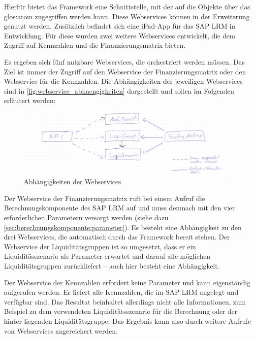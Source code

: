 \begin{onehalfspacing}
Hierfür bietet das Framework eine Schnittstelle, mit der auf die Objekte über das \gls{glos:atom} zugegriffen werden kann. Diese Webservices können in der Erweiterung genutzt werden. Zusätzlich befindet sich eine iPad-App für das SAP LRM in Entwicklung. Für diese wurden zwei weitere Webservices entwickelt, die dem Zugriff auf Kennzahlen und die Finanzierungsmatrix bieten.

Es ergeben sich fünf nutzbare Webservices, die orchestriert werden müssen. Das Ziel ist immer der Zugriff auf den Webservice der Finanzierungsmatrix oder den Webservice für die Kennzahlen. Die Abhängigkeiten der jeweiligen Webservices sind in \vref{fig:webservice_abhaengigkeiten} dargestellt und sollen im Folgenden erläutert werden:

\begin{figure}[h]
\centering
\setlength{\unitlength}{1mm}
\includegraphics[width=15cm]{images/WebService-Abhaengigkeiten.jpg}
\caption{Abhängigkeiten der Webservices\label{fig:webservice_abhaengigkeiten}}
\end{figure}


Der Webservice der Finanzierungsmatrix ruft bei einem Aufruf die Berechnungskomponente des SAP LRM auf und muss demnach mit den vier erforderlichen Parametern versorgt werden (siehe dazu \vref{sec:berechnungskomponente:parameter}). Es besteht eine Abhängigkeit zu den drei Webservices, die automatisch durch das Framework  bereit stehen. Der Webservice der Liquiditätsgruppen ist so umgesetzt, dass er ein Liquiditässzenario als Parameter erwartet und darauf alle möglichen Liquiditätsgruppen zurückliefert -- auch hier besteht eine Abhängigkeit.

Der Webservice der Kennzahlen erfordert keine Parameter und kann eigenständig aufgerufen werden. Er liefert alle Kennzahlen, die im SAP LRM angelegt und verfügbar sind. Das Resultat beinhaltet allerdings nicht alle Informationen, zum Beispiel zu dem verwendeten Liquiditätsszenario für die Berechnung oder der hinter liegenden Liquiditätsgruppe. Das Ergebnis kann also durch weitere Aufrufe von Webservices angereichert werden.


\end{onehalfspacing}
